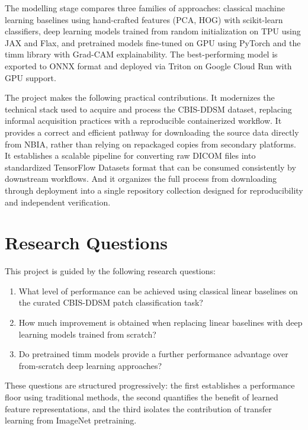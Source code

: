 \documentclass[justified,notoc,openany]{tufte-book}
\providecommand{\tightlist}{%
  \setlength{\itemsep}{0pt}\setlength{\parskip}{0pt}}
\begin{document}
The modelling stage compares three families of approaches: classical machine learning baselines using hand-crafted features (PCA, HOG) with scikit-learn classifiers, deep learning models trained from random initialization on TPU using JAX and Flax, and pretrained models fine-tuned on GPU using PyTorch and the timm library with Grad-CAM explainability. The best-performing model is exported to ONNX format and deployed via Triton on Google Cloud Run with GPU support.

The project makes the following practical contributions. It modernizes the technical stack used to acquire and process the CBIS-DDSM dataset, replacing informal acquisition practices with a reproducible containerized workflow. It provides a correct and efficient pathway for downloading the source data directly from NBIA, rather than relying on repackaged copies from secondary platforms. It establishes a scalable pipeline for converting raw DICOM files into standardized TensorFlow Datasets format that can be consumed consistently by downstream workflows. And it organizes the full process from downloading through deployment into a single repository collection designed for reproducibility and independent verification.

\section{Research Questions}\label{research-questions}

This project is guided by the following research questions:

\begin{enumerate}
\def\labelenumi{\arabic{enumi}.}
\tightlist
\item
  What level of performance can be achieved using classical linear baselines on the curated CBIS-DDSM patch classification task?
\item
  How much improvement is obtained when replacing linear baselines with deep learning models trained from scratch?
\item
  Do pretrained timm models provide a further performance advantage over from-scratch deep learning approaches?
\end{enumerate}

These questions are structured progressively: the first establishes a performance floor using traditional methods, the second quantifies the benefit of learned feature representations, and the third isolates the contribution of transfer learning from ImageNet pretraining.
\end{document}
